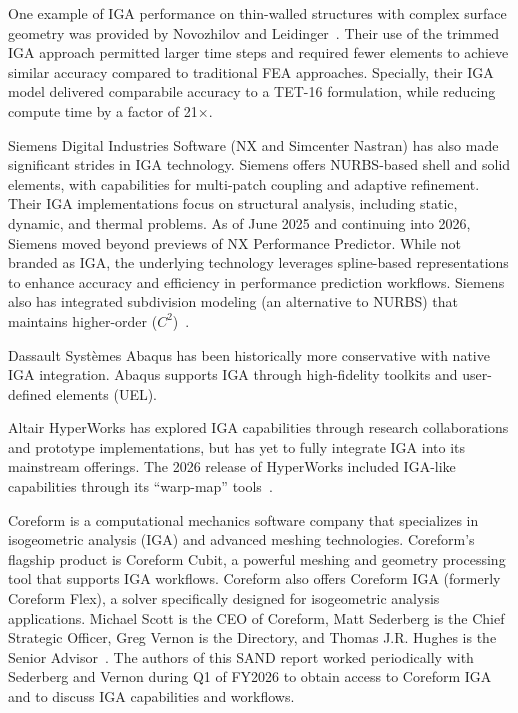 \documentclass[12pt,report,justified]{SANDreport}
\begin{document}
One example of IGA performance on thin-walled structures with complex surface geometry was provided by Novozhilov and Leidinger~\cite{Novozhilov2025}.  Their use of the trimmed IGA approach permitted larger time steps and required fewer elements to achieve similar accuracy compared to traditional FEA approaches.  Specially, their IGA model delivered comparabile accuracy to a TET-16 formulation, while reducing compute time by a factor of 21$\times$.

Siemens Digital Industries Software (NX and Simcenter Nastran) has also made significant strides in IGA technology.  Siemens offers NURBS-based shell and solid elements, with capabilities for multi-patch coupling and adaptive refinement.  Their IGA implementations focus on structural analysis, including static, dynamic, and thermal problems.  As of June 2025 and continuing into 2026, Siemens moved beyond previews of NX Performance Predictor.  While not branded as IGA, the underlying technology leverages spline-based representations to enhance accuracy and efficiency in performance prediction workflows.  Siemens also has integrated subdivision modeling (an alternative to NURBS) that maintains higher-order ($C^2$)~\cite{SiemensNX2025}.

Dassault Syst\`{e}mes Abaqus has been historically more conservative with native IGA integration.  Abaqus supports IGA through high-fidelity toolkits and user-defined elements (UEL).

Altair HyperWorks has explored IGA capabilities through research collaborations and prototype implementations, but has yet to fully integrate IGA into its mainstream offerings.  The 2026 release of HyperWorks included IGA-like capabilities through its ``warp-map'' tools~\cite{Altair2026}.

Coreform is a computational mechanics software company that specializes in isogeometric analysis (IGA) and advanced meshing technologies.  Coreform's flagship product is Coreform Cubit, a powerful meshing and geometry processing tool that supports IGA workflows.  Coreform also offers Coreform IGA (formerly Coreform Flex), a solver specifically designed for isogeometric analysis applications.  Michael Scott is the CEO of Coreform, Matt Sederberg is the Chief Strategic Officer, Greg Vernon is the Directory, and Thomas J.R. Hughes is the Senior Advisor~\cite{CoreforeAbout2026}.  The authors of this SAND report worked periodically with Sederberg and Vernon during Q1 of FY2026 to obtain access to Coreform IGA and to discuss IGA capabilities and workflows.
\end{document}
